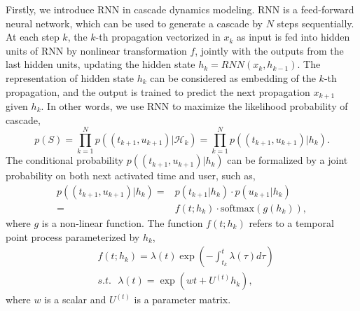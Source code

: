 Firstly, we introduce RNN in cascade dynamics modeling. RNN is a feed-forward
neural network, which can be used to generate a cascade by $N$ steps
sequentially.
At each step $k$, the $k$-th propagation vectorized in $x_k$ as input is fed
into hidden units of RNN by nonlinear transformation $f$, jointly with the outputs from the last hidden units, updating the hidden state
$h_k=\textit{RNN}(x_k,h_{k-1})$. The representation of hidden state $h_k$ can be
considered as embedding of the $k$-th propagation, and the output is trained to predict the
next propagation $x_{k+1}$ given $h_k$. In other words, we use RNN to
maximize the likelihood probability of cascade,
\begin{equation*}
p(S) = \prod_{k=1}^N p((t_{k+1}, u_{k+1})|\mathcal{H}_k) = \prod_{k=1}^N
p((t_{k+1}, u_{k+1})|h_k).
\end{equation*}
The conditional probability $p((t_{k+1}, u_{k+1})|h_k)$ can be
formalized by a joint probability on both next activated time and user, such as,
\begin{equation*}
\label{eq:cond_prob}
\begin{aligned}
p((t_{k+1}, u_{k+1})|h_k)=& p(t_{k+1}|h_{k}) \cdot
p(u_{k+1}|h_{k}) \\
= & f(t; h_{k}) \cdot \text{softmax}(g(h_k)),
\end{aligned}
\end{equation*}
where $g$ is a non-linear function.
The function $f(t;h_{k})$ refers to a temporal point process
parameterized by $h_{k}$,
\begin{equation*}
\begin{aligned}
& f(t; h_{k})=\lambda(t)\exp\left(-\int_{t_k}^t\lambda(\tau)d\tau\right) \\
&\textit{s.t.~~} \lambda(t) = \exp(wt+U^{(t)}h_k), 
\end{aligned}
\end{equation*}
where $w$ is a scalar and $U^{(t)}$ is a parameter matrix.
